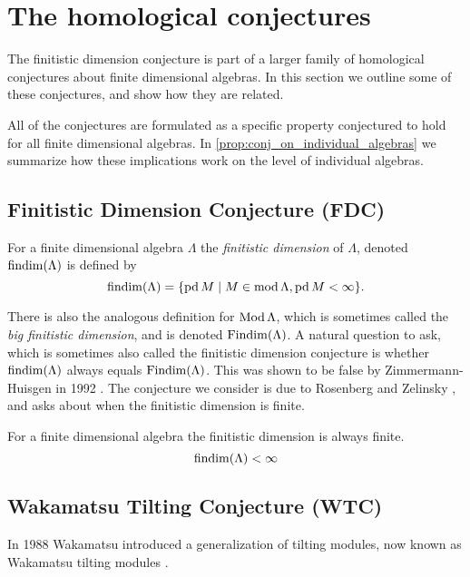 \section{The homological conjectures}\label{sec:homological_conjectures}

The finitistic dimension conjecture is part of a larger family of homological conjectures about finite dimensional algebras. In this section we outline some of these conjectures, and show how they are related.

All of the conjectures are formulated as a specific property conjectured to hold for all finite dimensional algebras. In \cref{prop:conj_on_individual_algebras} we summarize how these implications work on the level of individual algebras.

\subsection*{Finitistic Dimension Conjecture (FDC)}
\begin{defn}
	For a finite dimensional algebra $\Lambda$ the \emph{finitistic dimension} of $\Lambda$, denoted $\operatorname{findim}(\Lambda)$ is defined by
	$$\operatorname{findim}(\Lambda) = \{\operatorname{pd} M \mid M \in \operatorname{mod}\Lambda, \operatorname{pd} M < \infty\}.$$
\end{defn}

There is also the analogous definition for $\operatorname{Mod}\Lambda$, which is sometimes called the \emph{big finitistic dimension}, and is denoted $\operatorname{Findim}(\Lambda)$. A natural question to ask, which is sometimes also called the finitistic dimension conjecture is whether $\operatorname{findim}(\Lambda)$ always equals $\operatorname{Findim}(\Lambda)$. This was shown to be false by Zimmermann-Huisgen in 1992 \cite{ZH92}. The conjecture we consider is due to Rosenberg and Zelinsky \cite{Bass60}, and asks about when the finitistic dimension is finite.

\begin{conj}
	For a finite dimensional algebra the finitistic dimension is always finite.
	$$\operatorname{findim}(\Lambda) < \infty$$
\end{conj}

\subsection*{Wakamatsu Tilting Conjecture (WTC)}
In 1988 Wakamatsu introduced a generalization of tilting modules, now known as Wakamatsu tilting modules \cite{Wak88}.

